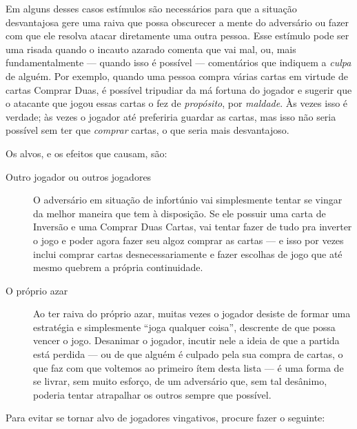 Em alguns desses casos estímulos são necessários para que a situação desvantajosa gere uma raiva que possa obscurecer a mente do adversário ou fazer com que ele resolva atacar diretamente uma outra pessoa. Esse estímulo pode ser uma risada quando o incauto azarado comenta que vai mal, ou, mais fundamentalmente --- quando isso é possível --- comentários que indiquem a \textit{culpa} de alguém. Por exemplo, quando uma pessoa compra várias cartas em virtude de cartas Comprar Duas, é possível tripudiar da má fortuna do jogador e sugerir que o atacante que jogou essas cartas o fez de \textit{propósito}, por \textit{maldade}. Às vezes isso é verdade; às vezes o jogador até preferiria guardar as cartas, mas isso não seria possível sem ter que \textit{comprar} cartas, o que seria mais desvantajoso.

Os alvos, e os efeitos que causam, são:

\begin{description}
\item[Outro jogador ou outros jogadores]{O adversário em situação de infortúnio vai simplesmente tentar se vingar da melhor maneira que tem à disposição. Se ele possuir uma carta de Inversão e uma Comprar Duas Cartas, vai tentar fazer de tudo pra inverter o jogo e poder agora fazer seu algoz comprar as cartas --- e isso por vezes inclui comprar cartas desnecessariamente e fazer escolhas de jogo que até mesmo quebrem a própria continuidade.}
\item[O próprio azar]{Ao ter raiva do próprio azar, muitas vezes o jogador desiste de formar uma estratégia e simplesmente ``joga qualquer coisa'', descrente de que possa vencer o jogo. Desanimar o jogador, incutir nele a ideia de que a partida está perdida --- ou de que alguém é culpado pela sua compra de cartas, o que faz com que voltemos ao primeiro ítem desta lista --- é uma forma de se livrar, sem muito esforço, de um adversário que, sem tal desânimo, poderia tentar atrapalhar os outros sempre que possível.}
\end{description}

Para evitar se tornar alvo de jogadores vingativos, procure fazer o seguinte:

